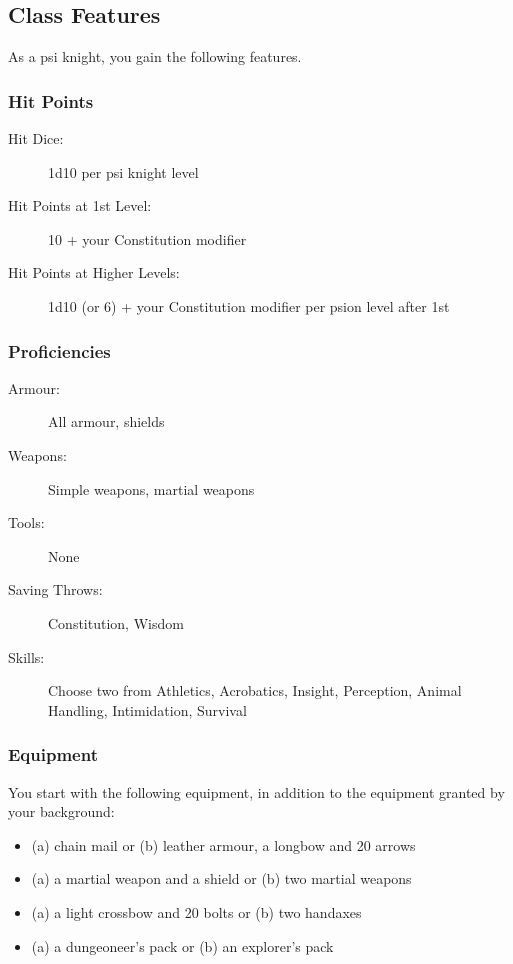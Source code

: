 \subsection{Class Features}
As a psi knight, you gain the following features.

\subsubsection{Hit Points}

\begin{description}
    \item[Hit Dice:] 1d10 per psi knight level
    \item[Hit Points at 1st Level:] 10 + your Constitution modifier
    \item[Hit Points at Higher Levels:] 1d10 (or 6) +
        your Constitution modifier per psion level after 1st
\end{description}

\subsubsection{Proficiencies}

\begin{description}
    \item[Armour:] All armour, shields
    \item[Weapons:] Simple weapons, martial weapons
    \item[Tools:] None \vspace{4pt}
    \item[Saving Throws:] Constitution, Wisdom
    \item[Skills:] Choose two from Athletics, Acrobatics, Insight,
        Perception, Animal Handling, Intimidation, Survival
\end{description}

\subsubsection{Equipment}
You start with the following equipment,
in addition to the equipment granted by your background:
\begin{itemize}
    \item (a) chain mail or
          (b) leather armour, a longbow
            and 20 arrows
    \item (a) a martial weapon and a shield or
          (b) two martial weapons
    \item (a) a light crossbow and 20 bolts or
          (b) two handaxes
    \item (a) a dungeoneer's pack or
          (b) an explorer's pack
\end{itemize}


